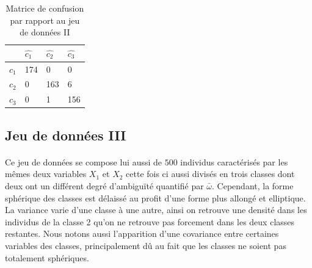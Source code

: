 		\begin{table}[H]
		\centering
		\begin{tabular}{|l|l|l|l|}
			\hline
			\textbf{}   & \textbf{$\hat{c_1}$} & \textbf{$\hat{c_2}$}  & \textbf{$\hat{c_3}$} \\ \hline
			\textbf{$c_1$} & 174         & 0           & 0           \\ \hline
			\textbf{$c_2$} & 0           & 163         & 6           \\ \hline
			\textbf{$c_3$} & 0         & 1           & 156           \\ \hline
			
		\end{tabular}
		\caption{Matrice de confusion par rapport au jeu de données II}
	\end{table}

	\subsection{Jeu de données III}
	\paragraph{}
	Ce jeu de données se compose lui aussi de $500$ individus caractérisés par les mêmes deux variables $X_1$ et $X_2$ cette fois ci aussi divisés en trois classes dont deux ont un différent degré d'ambiguïté quantifié par $\bar{\omega}$. Cependant, la forme sphérique des classes est délaissé au profit d'une forme plus allongé et elliptique. La variance varie d'une classe à une autre, ainsi on retrouve une densité dans les individus de la classe 2 qu'on ne retrouve pas forcement dans les deux classes restantes. Nous notons aussi l'apparition d'une covariance entre certaines variables des classes, principalement dû au fait que les classes ne soient pas totalement sphériques.
	
	
	
